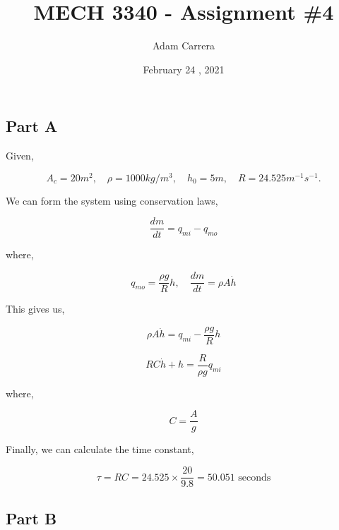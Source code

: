 \documentclass[12pt]{article}
\author{Adam Carrera}
\date{February 24 , 2021}
\title{MECH 3340 - Assignment \#4}
\numberwithin{equation}{subsection}
\begin{document}
  \maketitle

  \section{}

  \subsection{Part A}

  Given,

  \[
      A_c = 20 m^2, \quad \rho = 1000 kg/m^3, \quad h_0 = 5m, \quad R = 24.525 m^{-1}s^{-1}
    .\]

  We can form the system using conservation laws,

  \begin{equation}
    \frac{dm}{dt} = q_{mi} - q_{mo}
  \end{equation}

  where,

  \begin{equation}
    q_{mo} = \frac{\rho g}{R}h, \quad \frac{dm}{dt} = \rho A \dot h
  \end{equation}

  This gives us,

  \begin{equation}
    \rho A \dot h = q_{mi} - \frac{\rho g}{R}h
  \end{equation}

  \begin{equation}
    RC \dot h + h = \frac{R}{\rho g}q_{mi}
  \end{equation}

  where,

  \begin{equation}
    C = \frac{A}{g}
  \end{equation}

  Finally, we can calculate the time constant,

  \begin{equation}
    \tau = RC = 24.525 \times \frac{20}{9.8} = 50.051 \text{ seconds}
  \end{equation}

  \subsection{Part B}
\end{document}
